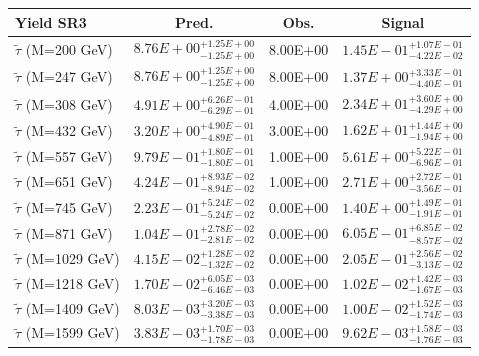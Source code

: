 \documentclass{article}
\begin{document}
 \begin{center}
 \begin{tabular}{ |l|c|c|c| } 
 \hline
 Yield SR3 & Pred. & Obs. & Signal \\
 \hline
 \hline
 $\tilde{\tau}$ (M=200 GeV) & $8.76E+00^{+1.25E+00}_{-1.25E+00}$ & 8.00E+00 & $1.45E-01^{+1.07E-01}_{-4.22E-02}$ \\
 \hline
 $\tilde{\tau}$ (M=247 GeV) & $8.76E+00^{+1.25E+00}_{-1.25E+00}$ & 8.00E+00 & $1.37E+00^{+3.33E-01}_{-4.40E-01}$ \\
 \hline
 $\tilde{\tau}$ (M=308 GeV) & $4.91E+00^{+6.26E-01}_{-6.29E-01}$ & 4.00E+00 & $2.34E+01^{+3.60E+00}_{-4.29E+00}$ \\
 \hline
 $\tilde{\tau}$ (M=432 GeV) & $3.20E+00^{+4.90E-01}_{-4.89E-01}$ & 3.00E+00 & $1.62E+01^{+1.44E+00}_{-1.94E+00}$ \\
 \hline
 $\tilde{\tau}$ (M=557 GeV) & $9.79E-01^{+1.80E-01}_{-1.80E-01}$ & 1.00E+00 & $5.61E+00^{+5.22E-01}_{-6.96E-01}$ \\
 \hline
 $\tilde{\tau}$ (M=651 GeV) & $4.24E-01^{+8.93E-02}_{-8.94E-02}$ & 1.00E+00 & $2.71E+00^{+2.72E-01}_{-3.56E-01}$ \\
 \hline
 $\tilde{\tau}$ (M=745 GeV) & $2.23E-01^{+5.24E-02}_{-5.24E-02}$ & 0.00E+00 & $1.40E+00^{+1.49E-01}_{-1.91E-01}$ \\
 \hline
 $\tilde{\tau}$ (M=871 GeV) & $1.04E-01^{+2.78E-02}_{-2.81E-02}$ & 0.00E+00 & $6.05E-01^{+6.85E-02}_{-8.57E-02}$ \\
 \hline
 $\tilde{\tau}$ (M=1029 GeV) & $4.15E-02^{+1.28E-02}_{-1.32E-02}$ & 0.00E+00 & $2.05E-01^{+2.56E-02}_{-3.13E-02}$ \\
 \hline
 $\tilde{\tau}$ (M=1218 GeV) & $1.70E-02^{+6.05E-03}_{-6.46E-03}$ & 0.00E+00 & $1.02E-02^{+1.42E-03}_{-1.67E-03}$ \\
 \hline
 $\tilde{\tau}$ (M=1409 GeV) & $8.03E-03^{+3.20E-03}_{-3.38E-03}$ & 0.00E+00 & $1.00E-02^{+1.52E-03}_{-1.74E-03}$ \\
 \hline
 $\tilde{\tau}$ (M=1599 GeV) & $3.83E-03^{+1.70E-03}_{-1.78E-03}$ & 0.00E+00 & $9.62E-03^{+1.58E-03}_{-1.76E-03}$ \\
 \hline
 \end{tabular}
 \end{center}
 
\end{document}
